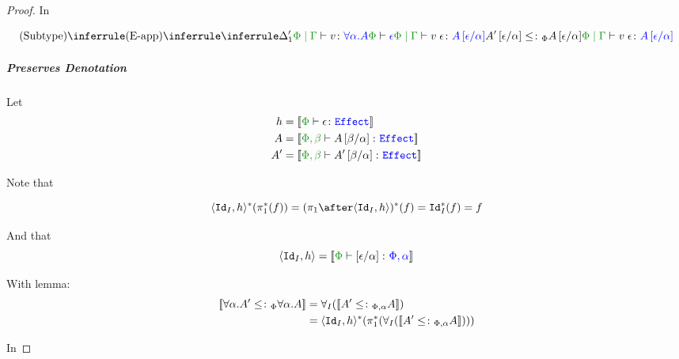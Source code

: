 \documentclass{report}
\begin{document}
\begin{framed}
\begin{proof}
                In
        
                \begin{equation}
                    \ntreeruleII{Subtype}{
                        \ntreeruleII{E-app}{
                            \treeruleI{\D_1'}{\gpetyperelation{v}{\all{\a}{A}}}}{\wellformed{\P}{\e}
                        }{\gpetyperelation{\eapp{v}{\e}}{A\ssub{\a}{\e}}}
                    }{
                    A'\ssub{\a}{\e}\subtypep A\ssub{\a}{\e}
                    }{
                        \gpetyperelation{\eapp{v}{\e}}{A\ssub{\a}{\e}}
                    }
                \end{equation}
        
                \subparagraph{Preserves Denotation}
                Let
                \begin{align*}
                    h &= \deno{\typerelation{\P}{\e}{\effect}}\\
                    A & = \deno{\typerelation{\P,\b}{A\ssub{\a}{\b}}{\effect}}\\
                    A' & = \deno{\typerelation{\P,\b}{A'\ssub{\a}{\b}}{\effect}}
                \end{align*}
        
                Note that 
        
                \begin{equation}
                    \pr{\Id{I}}{h}\star(\pstar(f)) = (\p\after\pr{\Id{I}}{h})\star(f) = \Id{I}\star(f) = f
                \end{equation}
        
                And that 
                \begin{equation}
                    \pr{\Id{I}}{h} = \deno{\typerelation{\P}{\ssub{\a}{\e}}{\P,\a}}
                \end{equation}
        
                With lemma:
                \begin{align*}
                    {\bf [\![}\forall \alpha. A'\leq\colon_\Phi{\forall \alpha. A}{\bf ]\!]} & = \forall_I({\bf [\![}A' \leq\colon_{\Phi, \alpha} A{\bf ]\!]})\\
                    & = \langle\texttt{Id}_{I}, h\rangle^*(\pi_1^*(\forall_I({\bf [\![}A' \leq\colon_{\Phi, \alpha} A{\bf ]\!]})))
                \end{align*}
        
                In
        

\end{proof}
\end{framed}
\end{document}
